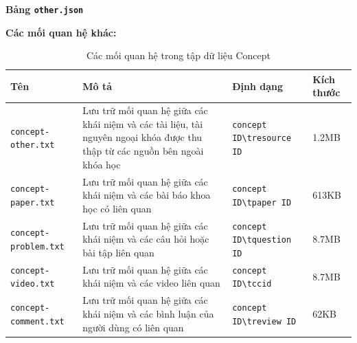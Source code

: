 \textbf{Bảng \texttt{other.json}}

\begin{table}[H]
\centering
{}
\caption{Cấu trúc bảng \texttt{other.json}}
\end{table}

\textbf{Các mối quan hệ khác:}

\begin{table}[H]
\centering
\resizebox{\textwidth}{!}
{%
\begin{tabular}{|l|p{7cm}|l|l|}
\hline
\textbf{Tên} & \textbf{Mô tả} & \textbf{Định dạng} & \textbf{Kích thước} \\ \hline
\texttt{concept-other.txt} & Lưu trữ mối quan hệ giữa các khái niệm và các tài liệu, tài nguyên ngoại khóa được thu thập từ các nguồn bên ngoài khóa học & \texttt{concept ID\textbackslash tresource ID} & 1.2MB \\ \hline
\texttt{concept-paper.txt} & Lưu trữ mối quan hệ giữa các khái niệm và các bài báo khoa học có liên quan & \texttt{concept ID\textbackslash tpaper ID} & 613KB \\ \hline
\texttt{concept-problem.txt} & Lưu trữ mối quan hệ giữa các khái niệm và các câu hỏi hoặc bài tập liên quan & \texttt{concept ID\textbackslash tquestion ID} & 8.7MB \\ \hline
\texttt{concept-video.txt} & Lưu trữ mối quan hệ giữa các khái niệm và các video liên quan & \texttt{concept ID\textbackslash tccid} & 8.7MB \\ \hline
\texttt{concept-comment.txt} & Lưu trữ mối quan hệ giữa các khái niệm và các bình luận của người dùng có liên quan & \texttt{concept ID\textbackslash treview ID} & 62KB \\ \hline
\end{tabular}%
}
\caption{Các mối quan hệ trong tập dữ liệu Concept}
\end{table}

